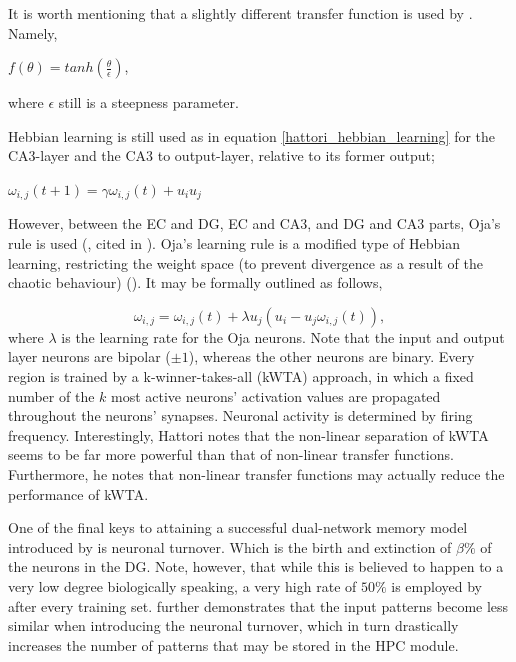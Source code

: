 It is worth mentioning that a slightly different transfer function is used by \cite{Hattori2014}. Namely,

\begin{center}
    $f(\theta) = tanh(\frac{\theta}{\epsilon})$,
\end{center}
where $\epsilon$ still is a steepness parameter.

Hebbian learning is still used as in equation \ref{hattori_hebbian_learning} for the CA3-layer and the CA3 to output-layer, relative to its former output;

\begin{center}
\begin{math}
    \omega_{i,j}(t+1) = \gamma \omega_{i,j}(t) + u_i u_j
\end{math}
\end{center}

However, between the EC and DG, EC and CA3, and DG and CA3 parts, Oja's rule is used (\cite{Hertz1991}, cited in \cite{Hattori2014}). Oja's learning rule is a modified type of Hebbian learning, restricting the weight space (to prevent divergence as a result of the chaotic behaviour) (\cite{}). It may be formally outlined as follows,

\begin{equation}\label{ojas_rule}
    \omega_{i,j} = \omega_{i,j}(t) + \lambda u_j (u_i - u_j \omega_{i,j}(t)),
\end{equation}
where $\lambda$ is the learning rate for the Oja neurons. Note that the input and output layer neurons are bipolar ($\pm 1$), whereas the other neurons are binary. Every region is trained by a k-winner-takes-all (kWTA) approach, in which a fixed number of the $k$ most active neurons' activation values are propagated throughout the neurons' synapses. Neuronal activity is determined by firing frequency. Interestingly, Hattori notes that the non-linear separation of kWTA seems to be far more powerful than that of non-linear transfer functions. Furthermore, he notes that non-linear transfer functions may actually reduce the performance of kWTA.

One of the final keys to attaining a successful dual-network memory model introduced by \cite{Hattori2014} is neuronal turnover. Which is the birth and extinction of $\beta \%$ of the neurons in the DG. Note, however, that while this is believed to happen to a very low degree biologically speaking, a very high rate of $50 \%$ is employed by \cite{Hattori2014}after every training set. \cite{Hattori2014} further demonstrates that the input patterns become less similar when introducing the neuronal turnover, which in turn drastically increases the number of patterns that may be stored in the HPC module.


